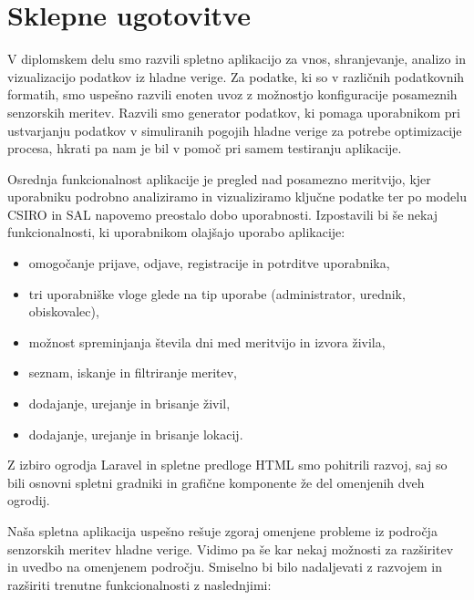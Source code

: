 \documentclass[a4paper, 12pt]{book}
\begin{document}
\chapter{Sklepne ugotovitve}

V diplomskem delu smo razvili spletno aplikacijo za vnos, shranjevanje, analizo in vizualizacijo podatkov iz hladne verige. Za podatke, ki so v različnih podatkovnih formatih, smo uspešno razvili enoten uvoz z možnostjo konfiguracije posameznih senzorskih meritev. Razvili smo generator podatkov, ki pomaga uporabnikom pri ustvarjanju podatkov v simuliranih pogojih hladne verige za potrebe optimizacije procesa, hkrati pa nam je bil v pomoč pri samem testiranju aplikacije. 

Osrednja funkcionalnost aplikacije je pregled nad posamezno meritvijo, kjer uporabniku podrobno analiziramo in vizualiziramo ključne podatke ter po modelu CSIRO in SAL napovemo preostalo dobo uporabnosti. Izpostavili bi še nekaj funkcionalnosti, ki uporabnikom olajšajo uporabo aplikacije:

\begin{itemize}
	\item omogočanje prijave, odjave, registracije in potrditve uporabnika,
	\item tri uporabniške vloge glede na tip uporabe (administrator, urednik, obiskovalec),
	\item možnost spreminjanja števila dni med meritvijo in izvora živila,
	\item seznam, iskanje in filtriranje meritev,
	\item dodajanje, urejanje in brisanje živil,
	\item dodajanje, urejanje in brisanje lokacij.
\end{itemize}

Z izbiro ogrodja Laravel in spletne predloge HTML smo pohitrili razvoj, saj so bili osnovni spletni gradniki in grafične komponente že del omenjenih dveh ogrodij.


Naša spletna aplikacija uspešno rešuje zgoraj omenjene probleme iz področja senzorskih meritev hladne verige. Vidimo pa še kar nekaj možnosti za razširitev in uvedbo na omenjenem področju. Smiselno bi bilo nadaljevati z razvojem in razširiti trenutne funkcionalnosti z naslednjimi:
\end{document}
